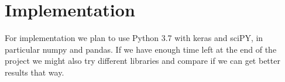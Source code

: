 \section{Implementation}
For implementation we plan to use Python 3.7 with keras\cite{KERAS} and sciPY\cite{SCIPY}, in particular numpy and pandas. If we have enough time left at the end of the project we might also try different libraries and compare if we can get better results that way.
